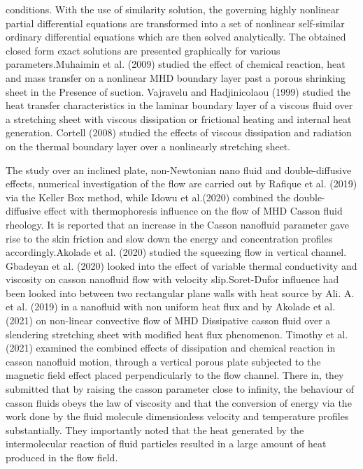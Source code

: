 \documentclass[a4paper,12pt]{report}
\begin{document}
{conditions. With the use of similarity solution, the governing highly nonlinear partial differential equations are transformed into a set of nonlinear self-similar ordinary differential equations which are then solved analytically. The obtained closed form exact solutions are presented graphically for various parameters.Muhaimin et al. (2009) studied the effect of chemical reaction, heat and mass transfer on a nonlinear MHD boundary layer past a porous shrinking sheet in the Presence of suction. Vajravelu and Hadjinicolaou (1999) studied the heat transfer characteristics in the laminar boundary layer of a viscous fluid over a stretching sheet with viscous dissipation or frictional heating and internal heat generation. Cortell (2008) studied the effects of viscous dissipation and radiation on the thermal boundary layer over a nonlinearly stretching sheet.

The study over an inclined plate, non-Newtonian nano fluid and double-diffusive effects, numerical investigation of the flow are carried out by Rafique et al. (2019) via the Keller Box method, while Idowu et al.(2020) combined the double-diffusive effect with thermophoresis influence on the flow of MHD Casson fluid rheology. It is reported that an increase in the Casson nanofluid parameter gave rise to the skin friction and slow down the energy and concentration profiles accordingly.Akolade et al. (2020) studied the squeezing flow in vertical channel. Gbadeyan et al. (2020) looked into the effect of variable thermal conductivity and viscosity on casson nanofluid flow with velocity slip.Soret-Dufor influence had been looked into between two rectangular plane walls with heat source by Ali. A. et al. (2019) in a nanofluid with non uniform heat flux and by Akolade et al. (2021) on non-linear convective flow of MHD Dissipative casson fluid over a slendering stretching sheet with modified heat flux phenomenon.
Timothy et al. (2021) examined the combined effects of dissipation and chemical reaction in casson nanofluid motion, through a vertical porous plate subjected to the magnetic field effect placed perpendicularly to the flow channel. There in, they submitted that by raising the casson parameter close to infinity, the behaviour of casson fluids obeys the law of viscosity and that the conversion of energy via the work done by the fluid molecule dimensionless velocity and temperature profiles substantially. They importantly noted that the heat generated by the intermolecular reaction of fluid particles resulted in a large amount of heat produced in the flow field. 

}
\end{document}
